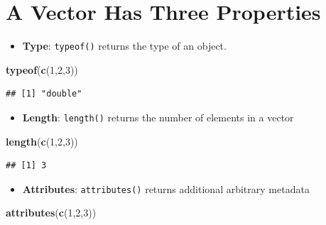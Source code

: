 \documentclass[]{book}
\newenvironment{Shaded}{\begin{snugshade}}{\end{snugshade}}
\newcommand{\DecValTok}[1]{\textcolor[rgb]{0.00,0.00,0.81}{#1}}
\newcommand{\KeywordTok}[1]{\textcolor[rgb]{0.13,0.29,0.53}{\textbf{#1}}}
\newcommand{\NormalTok}[1]{#1}
\providecommand{\tightlist}{%
  \setlength{\itemsep}{0pt}\setlength{\parskip}{0pt}}
\begin{document}
\hypertarget{a-vector-has-three-properties}{%
\section{A Vector Has Three Properties}\label{a-vector-has-three-properties}}

\begin{itemize}
\tightlist
\item
  \textbf{Type}: \texttt{typeof()} returns the type of an object.
\end{itemize}

\begin{Shaded}
\begin{Highlighting}[]
\KeywordTok{typeof}\NormalTok{(}\KeywordTok{c}\NormalTok{(}\DecValTok{1}\NormalTok{,}\DecValTok{2}\NormalTok{,}\DecValTok{3}\NormalTok{))}
\end{Highlighting}
\end{Shaded}

\begin{verbatim}
## [1] "double"
\end{verbatim}

\begin{itemize}
\tightlist
\item
  \textbf{Length}: \texttt{length()} returns the number of elements in a vector
\end{itemize}

\begin{Shaded}
\begin{Highlighting}[]
\KeywordTok{length}\NormalTok{(}\KeywordTok{c}\NormalTok{(}\DecValTok{1}\NormalTok{,}\DecValTok{2}\NormalTok{,}\DecValTok{3}\NormalTok{))}
\end{Highlighting}
\end{Shaded}

\begin{verbatim}
## [1] 3
\end{verbatim}

\begin{itemize}
\tightlist
\item
  \textbf{Attributes}: \texttt{attributes()} returns additional arbitrary metadata
\end{itemize}

\begin{Shaded}
\begin{Highlighting}[]
\KeywordTok{attributes}\NormalTok{(}\KeywordTok{c}\NormalTok{(}\DecValTok{1}\NormalTok{,}\DecValTok{2}\NormalTok{,}\DecValTok{3}\NormalTok{))}
\end{Highlighting}
\end{Shaded}
\end{document}
